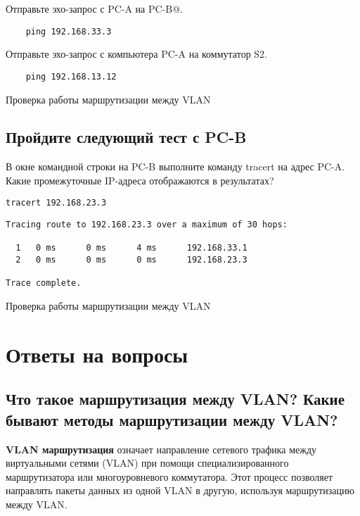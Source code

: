 Отправьте эхо-запрос с PC-A на PC-B@.

\begin{verbatim}
	ping 192.168.33.3
\end{verbatim}

Отправьте эхо-запрос с компьютера PC-A на коммутатор S2.

\begin{verbatim}
	ping 192.168.13.12
\end{verbatim}

\begin{image}
	\caption{Проверка работы маршрутизации между VLAN}
	\label{fig:pc0ping}
\end{image}

\subsection{Пройдите следующий тест с PC-B}
В окне командной строки на PC-B выполните команду tracert на адрес PC-A.
Какие промежуточные IP-адреса отображаются в результатах?

\begin{verbatim}
tracert 192.168.23.3
\end{verbatim}

\begin{verbatim}
Tracing route to 192.168.23.3 over a maximum of 30 hops: 

  1   0 ms      0 ms      4 ms      192.168.33.1
  2   0 ms      0 ms      0 ms      192.168.23.3

Trace complete.
\end{verbatim}

\begin{image}
	\caption{Проверка работы маршрутизации между VLAN}
	\label{fig:pc1ping}
\end{image}


\section{Ответы на вопросы}

\subsection{Что такое маршрутизация между VLAN? Какие бывают методы
	маршрутизации между VLAN?}

\textbf{VLAN маршрутизация} означает направление сетевого трафика
между виртуальными сетями (VLAN) при помощи специализированного маршрутизатора
или многоуровневого коммутатора.
Этот процесс позволяет направлять пакеты данных из одной VLAN в другую,
используя маршрутизацию между VLAN.

